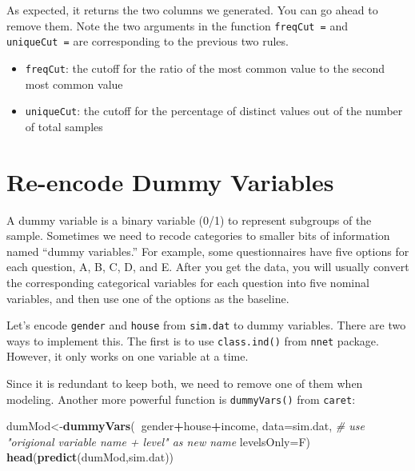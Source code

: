 \documentclass[12pt,]{krantz}
\makeatletter
\newenvironment{Shaded}{\begin{snugshade}}{\end{snugshade}}
\newcommand{\KeywordTok}[1]{\textcolor[rgb]{0.27,0.27,0.27}{\textbf{#1}}}
\newcommand{\DataTypeTok}[1]{\textcolor[rgb]{0.27,0.27,0.27}{#1}}
\newcommand{\CommentTok}[1]{\textcolor[rgb]{0.37,0.37,0.37}{\textit{#1}}}
\newcommand{\OperatorTok}[1]{\textcolor[rgb]{0.43,0.43,0.43}{\textbf{#1}}}
\newcommand{\NormalTok}[1]{#1}
\providecommand{\tightlist}{%
  \setlength{\itemsep}{0pt}\setlength{\parskip}{0pt}}
\newenvironment{kframe}{%
\medskip{}
\setlength{\fboxsep}{.8em}
 \def\at@end@of@kframe{}%
 \ifinner\ifhmode%
  \def\at@end@of@kframe{\end{minipage}}%
  \begin{minipage}{\columnwidth}%
 \fi\fi%
 \def\FrameCommand##1{\hskip\@totalleftmargin \hskip-\fboxsep
 \colorbox{shadecolor}{##1}\hskip-\fboxsep
     \hskip-\linewidth \hskip-\@totalleftmargin \hskip\columnwidth}%
 \MakeFramed {\advance\hsize-\width
   \@totalleftmargin\z@ \linewidth\hsize
   \@setminipage}}%
 {\par\unskip\endMakeFramed%
 \at@end@of@kframe}
\renewenvironment{Shaded}{\begin{kframe}}{\end{kframe}}
\theoremstyle{definition}
\theoremstyle{definition}
\theoremstyle{definition}
\theoremstyle{remark}
\makeatother
\begin{document}
As expected, it returns the two columns we generated. You can go ahead
to remove them. Note the two arguments in the function
\texttt{freqCut\ =} and \texttt{uniqueCut\ =} are corresponding to the
previous two rules.

\begin{itemize}
\tightlist
\item
  \texttt{freqCut}: the cutoff for the ratio of the most common value to
  the second most common value
\item
  \texttt{uniqueCut}: the cutoff for the percentage of distinct values
  out of the number of total samples
\end{itemize}

\section{Re-encode Dummy Variables}\label{re-encode-dummy-variables}

A dummy variable is a binary variable (0/1) to represent subgroups of
the sample. Sometimes we need to recode categories to smaller bits of
information named ``dummy variables.'' For example, some questionnaires
have five options for each question, A, B, C, D, and E. After you get
the data, you will usually convert the corresponding categorical
variables for each question into five nominal variables, and then use
one of the options as the baseline.

Let's encode \texttt{gender} and \texttt{house} from \texttt{sim.dat} to
dummy variables. There are two ways to implement this. The first is to
use \texttt{class.ind()} from \texttt{nnet} package. However, it only
works on one variable at a time.

\begin{Shaded}
\end{Shaded}

Since it is redundant to keep both, we need to remove one of them when
modeling. Another more powerful function is \texttt{dummyVars()} from
\texttt{caret}:

\begin{Shaded}
\begin{Highlighting}[]
\NormalTok{dumMod<-}\KeywordTok{dummyVars}\NormalTok{(}\OperatorTok{~}\NormalTok{gender}\OperatorTok{+}\NormalTok{house}\OperatorTok{+}\NormalTok{income,}
                  \DataTypeTok{data=}\NormalTok{sim.dat,}
                  \CommentTok{# use "origional variable name + level" as new name}
                  \DataTypeTok{levelsOnly=}\NormalTok{F)}
\KeywordTok{head}\NormalTok{(}\KeywordTok{predict}\NormalTok{(dumMod,sim.dat))}
\end{Highlighting}
\end{Shaded}
\end{document}
